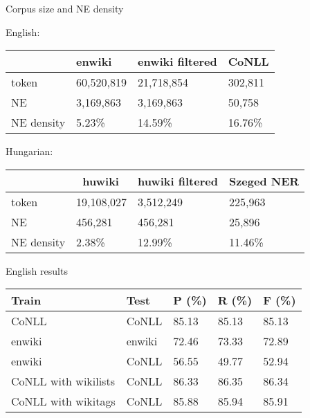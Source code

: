\documentclass[utf8x]{beamer}
\begin{document}
\begin{frame}{Corpus size and NE density}

English: 

\smallskip

\begin{center}
\begin{tabular}{llll}
\hline  & \bf enwiki & \bf enwiki filtered & \bf CoNLL \\ \hline
token & 60,520,819 & 21,718,854 & 302,811 \\
NE & 3,169,863 & 3,169,863 & 50,758 \\
NE density & 5.23\% & 14.59\% & 16.76\% \\ \hline
\end{tabular}
\end{center}

\smallskip

Hungarian:

\smallskip

\begin{center}
\begin{tabular}{llll}
\hline  & \bf huwiki & \bf huwiki filtered  & \bf Szeged NER \\ \hline
token & 19,108,027 & 3,512,249  & 225,963 \\
NE & 456,281 & 456,281  & 25,896 \\
NE density & 2.38\% & 12.99\%  & 11.46\% \\ \hline 
\end{tabular}
\end{center}

\end{frame}

\begin{frame}{English results}

\begin{center}
\begin{tabular}{lllll}
\hline \bf Train & \bf Test & \bf P (\%) & \bf R (\%) & \bf F (\%) \\ \hline
CoNLL & CoNLL & 85.13 & 85.13 & 85.13 \\
enwiki & enwiki & 72.46 & 73.33 &  72.89 \\
enwiki & CoNLL & 56.55 & 49.77 & 52.94 \\
CoNLL with wikilists & CoNLL & 86.33 & 86.35 & 86.34 \\
CoNLL with wikitags & CoNLL & 85.88 & 85.94 & 85.91 \\
\hline
\end{tabular}
\end{center}

\end{frame}
\end{document}
